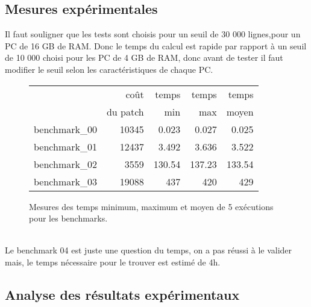 \documentclass[a4paper,10pt,french]{article}
\newcounter{question}%
\begin{document}
  \subsection{Mesures expérimentales}
Il faut souligner que les tests sont choisis pour un seuil de 30 000 lignes,pour un PC de 16 GB de RAM. Donc le temps du calcul est rapide par rapport à un seuil de 10 000 choisi pour les PC de 4 GB de RAM, donc avant de tester il faut modifier le seuil selon les caractéristiques de chaque PC.\\
    \begin{figure}[h]
      \begin{center}
        \begin{tabular}{|l||r||r|r|r||}
          \hline
          \hline
            & coût         & temps     & temps   & temps \\
            & du patch     & min       & max     & moyen \\
          \hline
          \hline
            benchmark\_00 &   10345   &  0.023   &  0.027   &    0.025 \\
          \hline
            benchmark\_01 & 12437     &  3.492  &    3.636 & 3.522    \\
          \hline
            benchmark\_02 &  3559   &   130.54 &    137.23 &   133.54  \\
          \hline
            benchmark\_03 &    19088   &    437  &  420   &  429    \\
          \hline
          \hline
        \end{tabular}
        \caption{Mesures des temps minimum, maximum et moyen de 5 exécutions pour les benchmarks.}
        \label{table-temps}
      \end{center}
    \end{figure}
    \\
Le benchmark 04 est juste une question du temps, on a pas réussi à le valider mais, le temps nécessaire pour le trouver est estimé de 4h.\\
\subsection{Analyse des résultats expérimentaux}
\end{document}
